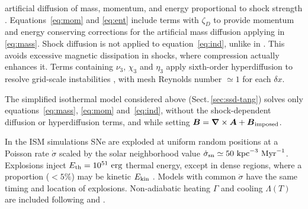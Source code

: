 \documentclass[preprint2]{aastex63}
\newcommand\SNr{\dot\sigma_{\rm sn}}
\newcommand\ESK{E_{\rm kin}}
\newcommand\EST{E_{\rm th}}
\newcommand{\vect}[1]{{{\mbox{\boldmath $#1$}}}}%
\newcommand\kpc{~ {\rm kpc}}
\newcommand\dx{ {\delta x}}
\newcommand\Myr{~ {\rm Myr}}
\newcommand\erg{~ {\rm erg}}
\newcommand{\fg}[1]{\textcolor{mypurple}{#1}}
\begin{document}
 artificial diffusion of mass, momentum, and energy proportional to shock
 strength \citep[see][for details]{GMKSH20}.
 {Equations~\eqref{eq:mom} and \eqref{eq:ent} include terms with $\zeta_D$}
 {to} {provide momentum and energy conserving corrections for} {the}
 {artificial mass diffusion applying in \eqref{eq:mass}.}
 Shock diffusion is not applied to equation~\eqref{eq:ind}{, unlike} {in}
 {\citet{Gent:2013b}.} {This avoids} {excessive magnetic dissipation in
 shocks, where compression actually enhances it.}
 Terms containing $\nu_3,\,\chi_3$ and $\eta_3$ apply sixth-order hyperdiffusion
 to resolve grid-scale instabilities \citep[see, e.g.,][]{ABGS02,HB04}, \fg{
 with mesh Reynolds number $\simeq1$ for each $\dx$}.

 {The simplified isothermal model considered above
 (Sect.\,\ref{sec:ssd-tang}) solves only equations~{\eqref{eq:mass},}
 \eqref{eq:mom} and~\eqref{eq:ind}, without the shock-dependent diffusion or
 hyperdiffusion terms, and while setting
 $\vect{B}=\vect\nabla\times\vect{A}+\vect{B}_{\rm imposed}$.}

 {In the ISM simulations} SNe are exploded at {uniform} random positions
 at a Poisson rate $\dot\sigma$ {scaled by} the solar neighborhood
 value $\SNr\simeq 50\kpc^{-3}\Myr^{-1}$.
 Explosions inject $\EST = 10^{51}\erg$ thermal energy, except in
 dense regions, where a proportion {($<5\%$) may be} kinetic $\ESK$ 
 \citep[see][]{GMKSH20}.
 {Models with common $\dot\sigma$ have the same timing and location of
 explosions.}
 Non-adiabatic heating $\Gamma$ and cooling $\Lambda (T)$ are included
 \citep{Gent:2013b} following \citet{Wolfire:1995} and \citet{Sarazin:1987}.
\end{document}
